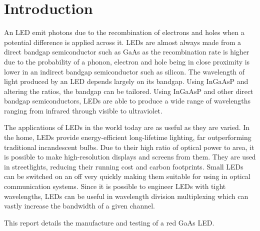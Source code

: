 \newpage
\section{Introduction}
\label{sec:intro}

An LED emit photons due to the recombination of electrons and holes when a potential difference is applied across it. LEDs are almost always made from a direct bandgap semiconductor such as GaAs as the recombination rate is higher due to the probability of a phonon, electron and hole being in close proximity is lower in an indirect bandgap semiconductor such as silicon. The wavelength of light produced by an LED depends largely on its bandgap. Using InGaAsP and altering the ratios, the bandgap can be tailored. Using InGaAsP and other direct bandgap semiconductors, LEDs are able to produce a wide range of wavelengths ranging from infrared through visible to ultraviolet.

The applications of LEDs in the world today are as useful as they are varied. In the home, LEDs provide energy-efficient long-lifetime lighting, far outperforming traditional incandescent bulbs. Due to their high ratio of optical power to area, it is possible to make high-resolution displays and screens from them. They are used in streetlights, reducing their running cost and carbon footprints. Small LEDs can be switched on an off very quickly making them suitable for using in optical communication systems. Since it is possible to engineer LEDs with tight wavelengths, LEDs can be useful in wavelength division multiplexing which can vastly increase the bandwidth of a given channel.

This report details the manufacture and testing of a red GaAs LED.


